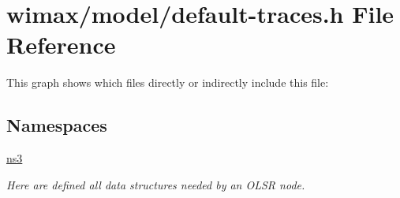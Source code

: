 \hypertarget{default-traces_8h}{}\section{wimax/model/default-\/traces.h File Reference}
\label{default-traces_8h}
This graph shows which files directly or indirectly include this file\+:
\subsection*{Namespaces}
\begin{DoxyCompactItemize}
\item 
 \hyperlink{namespacens3}{ns3}
\begin{DoxyCompactList}\small\item\em Here are defined all data structures needed by an O\+L\+SR node. \end{DoxyCompactList}\end{DoxyCompactItemize}
